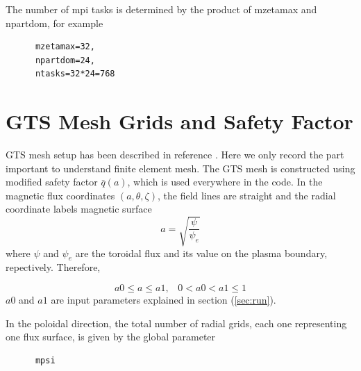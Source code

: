 \documentclass{report}
\newcommand{\ff}[2]{\frac{#1}{#2}}
\begin{document}
The number of mpi tasks is determined by the product of mzetamax and npartdom, for example

\begin{verbatim}
      mzetamax=32,
      npartdom=24,
      ntasks=32*24=768
\end{verbatim}

 

\section{GTS Mesh Grids and Safety Factor}
\label{sec:q}
GTS mesh setup has been described in reference \cite{WW1}.
Here we only record the part important to understand finite element mesh.
The GTS mesh is constructed using modified safety factor $\bar{q}(a)$,
which is used everywhere in the code.
In the magnetic flux coordinates $(a, \theta, \zeta)$, 
the field lines are straight and
the radial coordinate labels magnetic surface
$$
a = \sqrt{\ff{\psi}{\psi_e}}
$$
where $\psi$ and $\psi_e$ are the toroidal flux and its value on the plasma boundary, 
repectively. Therefore,

$$
a0 \leq a \leq a1,\;\;\; 0<a0<a1 \leq 1
$$
$a0$ and $a1$ are input parameters explained in section (\ref{sec:run}).

In the poloidal direction, the total number of radial grids,
each one representing one flux surface, is given by the global parameter

\begin{verbatim}
      mpsi
\end{verbatim}
\end{document}
